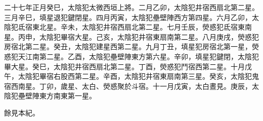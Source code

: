 \begin{pinyinscope}
 二十七年正月癸巳，太陰犯太微西垣上將。二月乙卯，太陰犯井宿西扇北第二星。三月辛巳，填星退犯鍵閉星。四月丙寅，太陰犯壘壁陣西方第四星。六月乙卯，太陰犯氐宿東北星。辛未，太陰犯井宿西扇北第二星。七月壬辰，熒惑犯氐宿東南星。丙申，太陰犯畢宿大星。己亥，太陰犯井宿東扇南第二星。八月庚戌，熒惑犯房宿北第二星。癸丑，太陰犯建星西第二星。九月丁丑，填星犯房宿北第一星，熒惑犯天江南第二星。乙酉，太陰犯壘壁陣東方第六星。辛卯，填星犯鍵閉，太陰犯畢大星。癸巳，太陰犯井宿西扇北第二星。丁酉，熒惑犯鬥宿西第二星。十月戊午，太陰犯畢宿右股西第二星。辛酉，太陰犯井宿東扇南第三星。癸亥，太陰犯鬼宿西南星。丁卯，歲星、太白、熒惑聚於斗宿。十一月戊寅，太白晝見。庚辰，太陰犯壘壁陣東方南東第一星。



 餘見本紀。



\end{pinyinscope}